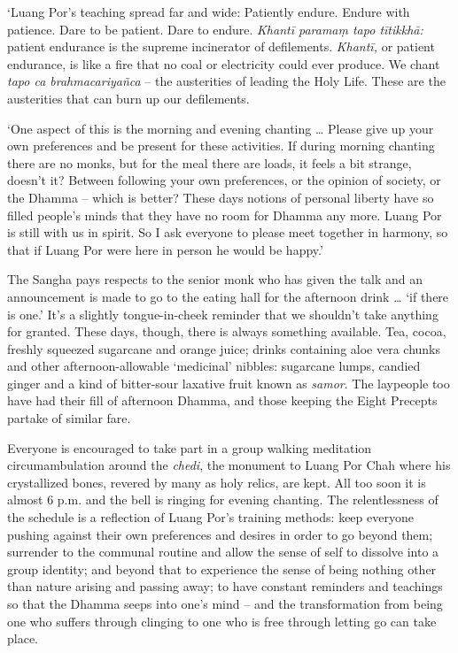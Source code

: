 `Luang Por's teaching spread far and wide: Patiently endure. Endure with
patience. Dare to be patient. Dare to endure. \emph{Khantī paramaṃ tapo
tītikkhā:} patient endurance is the supreme incinerator of defilements.
\emph{Khantī,} or patient endurance, is like a fire that no coal or
electricity could ever produce. We chant \emph{tapo ca brahmacariyañca}
-- the austerities of leading the Holy Life. These are the austerities
that can burn up our defilements.

`One aspect of this is the morning and evening chanting \ldots{}
Please give up your own preferences and be present for these activities. 
If during morning chanting there are no monks, but for the meal there
are loads, it feels a bit strange, doesn't it? Between following your
own preferences, or the opinion of society, or the Dhamma -- which is
better? These days notions of personal liberty have so filled people's
minds that they have no room for Dhamma any more. Luang Por is still
with us in spirit. So I ask everyone to please meet together in harmony, 
so that if Luang Por were here in person he would be happy.'

The Sangha pays respects to the senior monk who has given the talk and
an announcement is made to go to the eating hall for the afternoon drink
\ldots{} `if there is one.' It's a slightly tongue-in-cheek reminder
that we shouldn't take anything for granted. These days, though, there
is always something available. Tea, cocoa, freshly squeezed sugarcane
and orange juice; drinks containing aloe vera chunks and other
afternoon-allowable `medicinal' nibbles: sugarcane lumps, candied ginger
and a kind of bitter-sour laxative fruit known as \emph{samor}. The
laypeople too have had their fill of afternoon Dhamma, and those keeping
the Eight Precepts partake of similar fare. 

Everyone is encouraged to take part in a group walking meditation
circumambulation around the \emph{chedi}, the monument to Luang Por Chah
where his crystallized bones, revered by many as holy relics, are kept. 
All too soon it is almost 6 p.m. and the bell is ringing for evening
chanting. The relentlessness of the schedule is a reflection of Luang
Por's training methods: keep everyone pushing against their own
preferences and desires in order to go beyond them; surrender to the
communal routine and allow the sense of self to dissolve into a group
identity; and beyond that to experience the sense of being nothing other
than nature arising and passing away; to have constant reminders and
teachings so that the Dhamma seeps into one's mind -- and the
transformation from being one who suffers through clinging to one who is
free through letting go can take place. 

